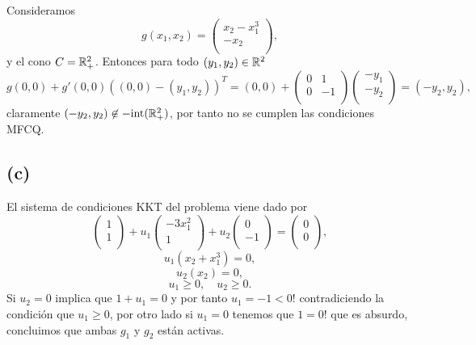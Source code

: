 Consideramos
\begin{equation*}
    g(x_1, x_2) =
    \begin{pmatrix}
        x_2 - x_1^3 \\
        -x_2 \\
    \end{pmatrix},
\end{equation*}
y el cono $C = \mathbb{R}^2_{+}$.
Entonces para todo $(y_1, y_2) \in \mathbb{R}^2$
\begin{equation*}
    g(0, 0) + g'(0, 0) ((0, 0) - (y_1, y_2))^T
    = (0, 0) + 
        \begin{pmatrix}
            0 & 1 \\
            0 & -1 \\
        \end{pmatrix}
        \begin{pmatrix}
            -y_1 \\
            -y_2 \\
        \end{pmatrix}
    = (-y_2, y_2),
\end{equation*}
claramente $(-y_2, y_2) \not\in - \text{int}(\mathbb{R}^2_{+})$,
por tanto no se cumplen las condiciones MFCQ.

\subsection*{(c)}

El sistema de condiciones KKT del problema viene dado por
\begin{equation*}
    \begin{pmatrix}
        1 \\
        1 \\
    \end{pmatrix} 
    + u_1
    \begin{pmatrix}
        -3 x_1^2 \\
        1 \\
    \end{pmatrix} 
    + u_2
    \begin{pmatrix}
        0 \\
        -1 \\
    \end{pmatrix} 
    =
    \begin{pmatrix}
        0 \\
        0 \\
    \end{pmatrix},
\end{equation*}
\begin{equation*}
    u_1(x_2 + x_1^3) = 0,
\end{equation*}
\begin{equation*}
    u_2(x_2) = 0,
\end{equation*}
\begin{equation*}
    u_1 \geq 0, \quad u_2 \geq 0.
\end{equation*}
Si $u_2 = 0$ implica que $1 + u_1 = 0$ y por tanto $u_1 = -1 < 0!$ contradiciendo la condición que $u_1 \geq 0$,
por otro lado si $u_1 = 0$ tenemos que $1 = 0!$ que es absurdo,
concluimos que ambas $g_1$ y $g_2$ están activas.

